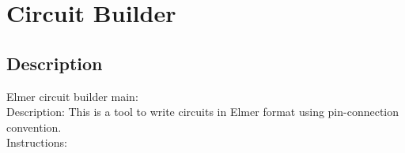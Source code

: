 \chapter*{Circuit Builder}

\section*{Description}

 Elmer circuit builder main:
\\
 Description:
                This is a tool to write circuits in Elmer format using pin-connection convention.
\\
 Instructions:
% 
%
%
